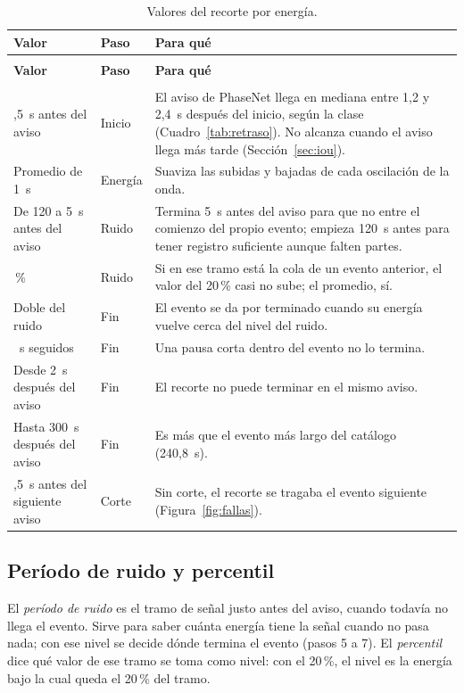 \documentclass[11pt,a4paper,oneside,spanish,oldfontcommands]{memoir}
\newcommand{\cabecera}[2]{%
  \toprule #1 \\ \midrule \endfirsthead
  \multicolumn{#2}{l}{\itshape Cuadro \thetable{} (continuación)}\\
  \toprule #1 \\ \midrule \endhead
  \midrule \multicolumn{#2}{r}{\itshape Continúa en la página siguiente}\\ \endfoot
  \bottomrule \endlastfoot}
\begin{document}
{\small
\setlength{\tabcolsep}{4pt}
\begin{longtable}{>{\raggedright\arraybackslash}p{3.4cm}>{\raggedright\arraybackslash}p{2.6cm}>{\raggedright\arraybackslash}p{8.6cm}}
\caption{Valores del recorte por energía.}\label{tab:esquema}\\
\cabecera{\textbf{Valor} & \textbf{Paso} & \textbf{Para qué}}{3}
2,5~s antes del aviso & Inicio & El aviso de PhaseNet llega en mediana entre 1,2 y 2,4~s después del inicio, según la clase (Cuadro~\ref{tab:retraso}). No alcanza cuando el aviso llega más tarde (Sección~\ref{sec:iou}). \\
Promedio de 1~s & Energía & Suaviza las subidas y bajadas de cada oscilación de la onda. \\
De 120 a 5~s antes del aviso & Ruido & Termina 5~s antes del aviso para que no entre el comienzo del propio evento; empieza 120~s antes para tener registro suficiente aunque falten partes. \\
20\,\% & Ruido & Si en ese tramo está la cola de un evento anterior, el valor del 20\,\% casi no sube; el promedio, sí. \\
Doble del ruido & Fin & El evento se da por terminado cuando su energía vuelve cerca del nivel del ruido. \\
5~s seguidos & Fin & Una pausa corta dentro del evento no lo termina. \\
Desde 2~s después del aviso & Fin & El recorte no puede terminar en el mismo aviso. \\
Hasta 300~s después del aviso & Fin & Es más que el evento más largo del catálogo (240,8~s). \\
2,5~s antes del siguiente aviso & Corte & Sin corte, el recorte se tragaba el evento siguiente (Figura~\ref{fig:fallas}). \\
\end{longtable}
}

\subsection*{Período de ruido y percentil}

El \emph{período de ruido} es el tramo de señal justo antes del aviso, cuando
todavía no llega el evento. Sirve para saber cuánta energía tiene la señal
cuando no pasa nada; con ese nivel se decide dónde termina el evento (pasos 5 a
7). El \emph{percentil} dice qué valor de ese tramo se toma como nivel: con el
20\,\%, el nivel es la energía bajo la cual queda el 20\,\% del tramo.
\end{document}
